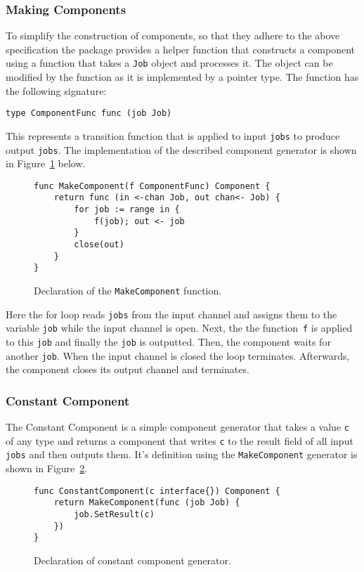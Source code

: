 \subsubsection{Making Components}
To simplify the construction of components, so that they adhere to 
the above specification the package provides a helper function that 
constructs a component using a function that takes a \texttt{Job} object 
and processes it. The object can be modified by the function as it is 
implemented by a pointer type. The function has the following signature:
\begin{lstlisting}
type ComponentFunc func (job Job)
\end{lstlisting}
This represents a transition function that is applied to input \texttt{jobs}
to produce output \texttt{jobs}.
The implementation of the described component generator is shown in 
Figure~\ref{fig:MakeComponent} below.
\begin{figure}[h]
\centering
\begin{lstlisting}
func MakeComponent(f ComponentFunc) Component {
    return func (in <-chan Job, out chan<- Job) {
        for job := range in {
            f(job); out <- job
        }
        close(out)
    }
}
\end{lstlisting}
\caption[scale=1.0]{Declaration of the \texttt{MakeComponent} function.}
\label{fig:MakeComponent}
\end{figure}

Here the for loop reads \texttt{jobs} from the input channel and assigns them
to the variable \texttt{job} while the input channel is open. Next, the 
the function~\texttt{f} is applied to this \texttt{job} and finally 
the \texttt{job} is outputted.
Then, the component waits for another \texttt{job}. When the input channel
is closed the loop terminates. Afterwards, the component closes its output channel
and terminates.

\subsubsection{Constant Component}
The Constant Component is a simple component generator that takes a value \texttt{c}
of any type and returns a component that writes \texttt{c} to the result field of 
all input \texttt{jobs} and then outputs them. It's definition using the 
\texttt{MakeComponent} generator is shown in Figure~\ref{fig:ConstantComponent}.
\begin{figure}[h]
\centering
\begin{lstlisting}
func ConstantComponent(c interface{}) Component {
    return MakeComponent(func (job Job) {
        job.SetResult(c)
    })
}
\end{lstlisting}
\caption[scale=1.0]{Declaration of constant component generator.}
\label{fig:ConstantComponent}
\end{figure}

